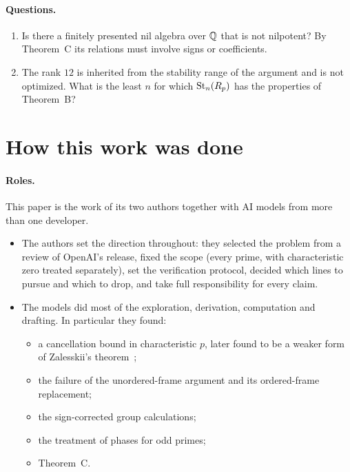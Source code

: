 \paragraph{Questions.}
\begin{enumerate}[label=(\arabic*),leftmargin=*]
\item Is there a finitely presented nil algebra over $\mathbb Q$ that is not nilpotent? By Theorem~C its relations must involve
  signs or coefficients.
\item The rank $12$ is inherited from the stability range of the argument and is not optimized. What is the least $n$
  for which $\operatorname{St}_n(R_p)$ has the properties of Theorem~B?
\end{enumerate}

\section{How this work was done}\label{sec:methods}

\paragraph{Roles.} This paper is the work of its two authors together with AI models from more than one developer.
\begin{itemize}[leftmargin=*]
\item The authors set the direction throughout: they selected the problem from a review of OpenAI's release, fixed the
  scope (every prime, with characteristic zero treated separately), set the verification protocol, decided which lines to
  pursue and which to drop, and take full responsibility for every claim.
\item The models did most of the exploration, derivation, computation and drafting. In particular they found:
  \begin{itemize}
  \item a cancellation bound in characteristic $p$, later found to be a weaker form of Zalesskii's
    theorem~\cite{Zalesskii1985};
  \item the failure of the unordered-frame argument and its ordered-frame replacement;
  \item the sign-corrected group calculations;
  \item the treatment of phases for odd primes;
  \item Theorem~C.
  \end{itemize}
\end{itemize}

